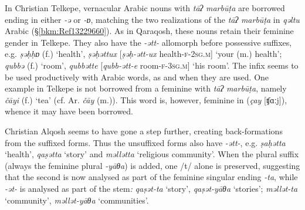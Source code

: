 \documentclass[output=paper]{langsci/langscibook}
\begin{document}
In Christian Telkepe, vernacular Arabic nouns with \textit{tāʔ} \textit{marbūṭa} are borrowed ending in either \textit{\nobreakdash-ə} or \textit{\nobreakdash-ɒ}, matching the two realizations of the \textit{tāʔ} \textit{marbūṭa} in \textit{qəltu} Arabic (§\ref{bkm:Ref13229660}). As in Qaraqosh, these nouns retain their feminine {gender} in Telkepe. They also have the \textit{\nobreakdash-ətt-} allomorph before possessive suffixes, e.g. \textit{ṣəḥḥɒ} (f.) ‘health’,  \textit{ṣəḥəttux} [\textit{ṣəḥ-ətt-ux} health-\textsc{f-2sg.m}] ‘your (m.) health’; \textit{qubbə} (f.) ‘room’, \textit{qubbətte} [\textit{qubb-ətt-e} room-\textsc{f-3sg.m}] ‘his room’. The infix seems to be used productively with Arabic words, as and when they are used. One example in Telkepe is not borrowed from a feminine with \textit{tāʔ} \textit{marbūṭa}, namely \textit{čāyi} (f.) ‘tea’ (cf.  Ar. \textit{čāy} (m.)). This word is, however, feminine in  (\textit{çay} [ʧɑːj]), whence it may have been borrowed.

Christian Alqosh seems to have gone a step further, creating {back-formations} from the suffixed forms. Thus the unsuffixed forms also have \textit{{}-ətt-}, e.g. \textit{ṣaḥətta} ‘health’, \textit{qaṣətta} ‘story’ and \textit{məllətta} ‘religious community’. When the plural suffix (always the feminine plural \textit{\nobreakdash-yāθa}) is added, one /t/ alone is preserved, suggesting that the second is now analysed as part of the feminine singular ending \textit{\nobreakdash-ta}, while \textit{\nobreakdash-ət\nobreakdash-} is analysed as part of the {stem}\textit{:} \textit{qaṣət\nobreakdash-ta} ‘story’, \textit{qaṣət\nobreakdash-yāθa} ‘stories’; \textit{məllət\nobreakdash-ta} ‘community’, \textit{məllət\nobreakdash-yāθa} ‘communities’.
\end{document}
